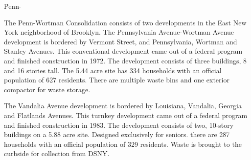 Penn-\par \vspace{.7\baselineskip}The Penn-Wortman Consolidation consists of two developments in the East New York neighborhood of Brooklyn. The Pennsylvania Avenue-Wortman Avenue development is bordered by Vermont Street, and Pennsylvania, Wortman and Stanley Avenues. This conventional development came out of a federal program and finished construction in 1972. The development consists of three buildings, 8 and 16 stories tall. The 5.44 acre site has 334 households with an official population of 627 residents. There are multiple waste bins and one exterior compactor for waste storage.\par \vspace{.7\baselineskip}The Vandalia Avenue development is bordered by Louisiana, Vandalia, Georgia and Flatlands Avenues. This turnkey development came out of a federal program and finished construction in 1983. The development consists of two, 10-story buildings on a 5.88 acre site. Designed exclusively for seniors. there are 287 households with an official population of 329 residents. Waste is brought to the curbside for collection from DSNY.